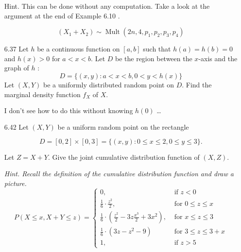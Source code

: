 \documentclass[10pt]{article}
\begin{document}
\begin{itemize}
Hint. This can be done without any computation. Take a look at the argument at the end of Example 6.10 .

\[ (X_1 + X_2) \sim  \operatorname{Mult}\left(2n, 4, p_{1}, p_{2}, p_{3}, p_{4}\right) \]

\newpage
	\item[6.37] Let $h$ be a continuous function on $[a, b]$ such that $h(a)=h(b)=0$ and $h(x)>0$ for $a<x<b$. Let $D$ be the region between the $x$-axis and the graph of $h$ :
	\[ D=\{(x, y): a<x<b, 0<y<h(x)\} \]
Let $(X, Y)$ be a uniformly distributed random point on $D$. Find the marginal density function $f_{X}$ of $X$.

I don't see how to do this without knowing $h(0)$ \dots

\newpage
	\item[6.42] Let $(X, Y)$ be a uniform random point on the rectangle

$$
D=[0,2] \times[0,3]=\{(x, y): 0 \leq x \leq 2,0 \leq y \leq 3\} .
$$

Let $Z=X+Y$. Give the joint cumulative distribution function of $(X, Z)$.

\emph{Hint. Recall the definition of the cumulative distribution function and draw a picture.}
\[
P(X \leq x, X + Y \leq z) =
\begin{cases}
0, & \text { if } z < 0 \\
\frac{1}{6} \cdot \frac{z^2}{2}, & \text { for } 0 \leq z \leq x \\
\frac{1}{6} \cdot \left( \frac{z^2}{2} -3z \frac{x^3}{2}  + 3x^2 \right) , & \text { for } x \leq z \leq 3 \\
\frac{1}{6} \cdot \left( 3z - z^2 - 9 \right) & \text { for } 3 \leq z \leq 3 + x \\
1, & \text { if } z > 5
\end{cases}
\]

\end{itemize}
\end{document}
